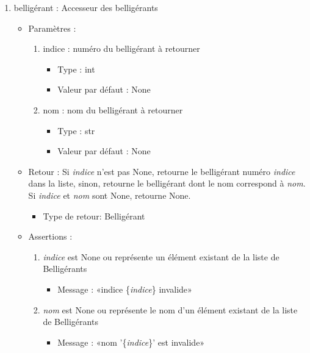 \documentclass[12pt,pdftex,oneside]{article}
\begin{document}
\begin{itemize}
\begin{enumerate}
    \item belligérant : Accesseur des belligérants
      \begin{itemize}
      \item Paramètres : 
        \begin{enumerate}
        \item indice : numéro du belligérant à retourner
          \begin{itemize}
          \item Type : int
          \item Valeur par défaut : None
          \end{itemize}
        \item nom : nom du belligérant à retourner
          \begin{itemize}
          \item Type : str
          \item Valeur par défaut : None
          \end{itemize}
        \end{enumerate}
      \item Retour : Si \emph{indice} n'est pas None, retourne le belligérant numéro
        \emph{indice} dans la liste, sinon, retourne le belligérant dont le nom
        correspond à \emph{nom}. Si \emph{indice} et \emph{nom} sont None, retourne None.
          \begin{itemize}
          \item Type de retour: Belligérant
          \end{itemize}
      \item Assertions : 
        \begin{enumerate}
            \item \emph{indice} est None ou représente un élément existant de la liste de
            Belligérants
            \begin{itemize}
              \item Message : «indice \{\emph{indice}\} invalide»
            \end{itemize}
            \item \emph{nom} est None ou représente le nom d'un élément existant de la liste de
            Belligérants
            \begin{itemize}
              \item Message : «nom '\{\emph{indice}\}' est invalide»
            \end{itemize}
        \end{enumerate}
      \end{itemize}


\end{enumerate}
\end{itemize}
\end{document}
